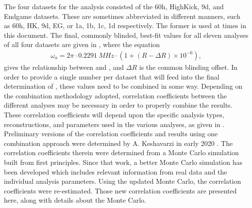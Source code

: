 The four datasets for the \Rone analysis consisted of the 60h, HighKick, 9d, and Endgame datasets. These are sometimes abbreviated in different manners, such as 60h, HK, 9d, EG, or 1a, 1b, 1c, 1d respectively. The former is used at times in this document. The final, commonly blinded, best-fit \R values for all eleven analyses of all four datasets are given in , where the equation
\begin{align}
  \omega_{a} = 2\pi \cdot \SI{0.2291}{MHz} \cdot (1 + (R - \Delta R) \times 10^{-6}),
\label{eq:wa}
\end{align}
gives the relationship between \wa and \R, and $\Delta R$ is the common blinding offset. In order to provide a single \wa number per dataset that will feed into the final determination of \amu, these \R values need to be combined in some way. Depending on the combination methodology adopted, correlation coefficients between the different analyses may be necessary in order to properly combine the results. These correlation coefficients will depend upon the specific analysis types, reconstructions, and parameters used in the various analyses, as given in . Preliminary versions of the correlation coefficients and results using one combination approach were determined by A. Keshavarzi in early 2020 \cite{AlexCombinationNote}. The correlation coefficients therein were determined from a Monte Carlo simulation built from first principles. Since that work, a better Monte Carlo simulation has been developed which includes relevant information from real data and the individual analysis parameters. Using the updated Monte Carlo, the correlation coefficients were re-estimated. Those new correlation coefficients are presented here, along with details about the Monte Carlo.


